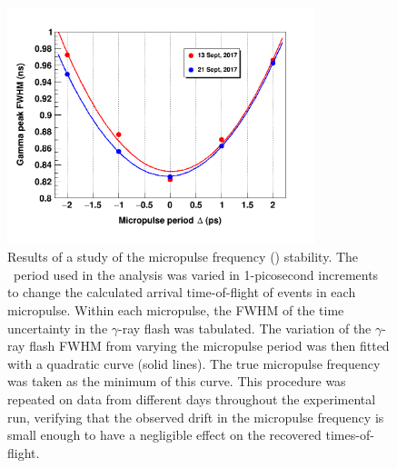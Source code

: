 \begin{figure}[h]
    \centering
    \includegraphics[width=0.8\textwidth]{figures/RFTimeStudy.png}
    \caption[Stability of the beam pick-off (\tZero) frequency during the experiment]
    {Results of a study of the micropulse frequency (\tZero) stability. The \tZero\ period used
        in the analysis was varied in 1-picosecond increments to change the
        calculated arrival time-of-flight of events in each micropulse.
        Within each micropulse, the FWHM of
        the time uncertainty in the $\gamma$-ray flash was tabulated. The
        variation of the $\gamma$-ray flash FWHM from varying the micropulse period was
        then fitted with a quadratic curve (solid lines). The true micropulse
        frequency was taken as the minimum of this curve. This procedure was
        repeated on data from different days throughout the experimental run,
        verifying that the observed drift in the micropulse frequency is small enough to have a 
        negligible effect on the recovered times-of-flight.
    }
    \label{RFTimeStudy}
\end{figure}

